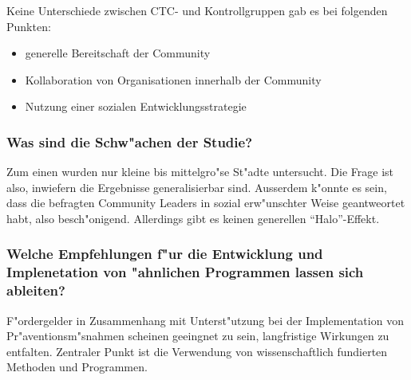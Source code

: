 Keine Unterschiede zwischen CTC- und Kontrollgruppen gab es bei folgenden Punkten:
\begin{itemize}
        \item generelle Bereitschaft der Community
        \item Kollaboration von Organisationen innerhalb der Community
        \item Nutzung einer sozialen Entwicklungsstrategie
\end{itemize}

\subsubsection{Was sind die Schw"achen der Studie?}
Zum einen wurden nur kleine bis mittelgro"se St"adte untersucht. Die Frage ist also, inwiefern die Ergebnisse generalisierbar sind. Ausserdem k"onnte es sein, dass die befragten Community Leaders in sozial erw"unschter Weise geantweortet habt, also besch"onigend. Allerdings gibt es keinen generellen ``Halo''-Effekt.

\subsubsection{Welche Empfehlungen f"ur die Entwicklung und Implenetation von "ahnlichen Programmen lassen sich ableiten?}
F"ordergelder in Zusammenhang mit Unterst"utzung bei der Implementation von Pr"aventionsm"snahmen scheinen geeingnet zu sein, langfristige Wirkungen zu entfalten. Zentraler Punkt ist die Verwendung von wissenschaftlich fundierten Methoden und Programmen.
